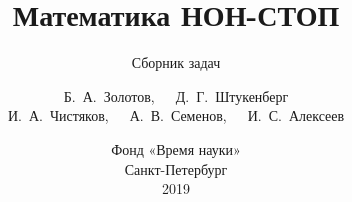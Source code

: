 \subject{\large\textrm{\ } %
	\vspace{0.8in}}

\title{\fontsize{25}{25}\selectfont
	Математика НОН-СТОП}
\subtitle{\fontsize{18}{18}\selectfont
	Сборник задач
	\vspace{1.05in}}

\author{Б.~А.~Золотов,\ \ \ Д.~Г.~Штукенберг \\
	И.~А.~Чистяков,\ \ \ А.~В.~Семенов,\ \ \ И.~С.~Алексеев
	\vspace{1.25in}}

\date{\normalsize Фонд «Время науки» \\ Санкт-Петербург \\ 2019}